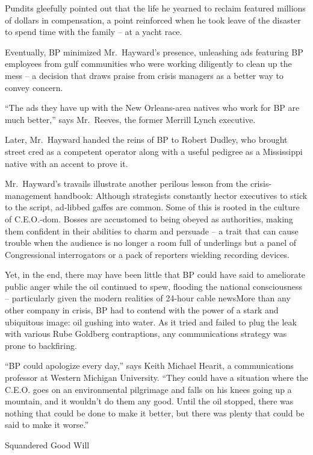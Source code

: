 ﻿\documentclass[12pt]{article}
\begin{document}
Pundits gleefully pointed out that the life he yearned to reclaim featured millions of dollars in
compensation, a point reinforced when he took leave of the disaster to spend time with the family --
at a yacht race.

Eventually, BP minimized Mr.~Hayward's presence, unleashing ads featuring BP employees from gulf
communities who were working diligently to clean up the mess -- a decision that draws praise from
crisis managers as a better way to convey concern.

``The ads they have up with the New Orleans-area natives who work for BP are much better,'' says
Mr.~Reeves, the former Merrill Lynch executive.

Later, Mr.~Hayward handed the reins of BP to Robert Dudley, who brought street cred as a competent
operator along with a useful pedigree as a Mississippi native with an accent to prove it.

Mr.~Hayward's travails illustrate another perilous lesson from the crisis-management handbook:
Although strategists constantly hector executives to stick to the script, ad-libbed gaffes are
common. Some of this is rooted in the culture of C.E.O.-dom. Bosses are accustomed to being obeyed
as authorities, making them confident in their abilities to charm and persuade -- a trait that can
cause trouble when the audience is no longer a room full of underlings but a panel of Congressional
interrogators or a pack of reporters wielding recording devices.

Yet, in the end, there may have been little that BP could have said to ameliorate public anger while
the oil continued to spew, flooding the national consciousness -- particularly given the modern
realities of 24-hour cable newsMore than any other company in crisis, BP had to contend with the
power of a stark and ubiquitous image: oil gushing into water. As it tried and failed to plug the
leak with various Rube Goldberg contraptions, any communications strategy was prone to backfiring.

``BP could apologize every day,'' says Keith Michael Hearit, a communications professor at Western
Michigan University. ``They could have a situation where the C.E.O. goes on an environmental
pilgrimage and falls on his knees going up a mountain, and it wouldn't do them any good. Until the
oil stopped, there was nothing that could be done to make it better, but there was plenty that could
be said to make it worse.''

Squandered Good Will
\end{document}

